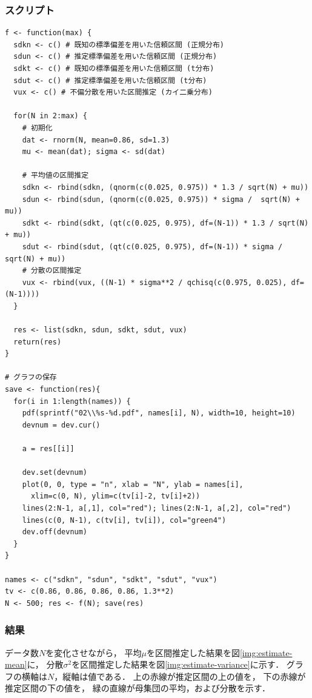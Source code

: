 \documentclass{jsarticle}
\begin{document}
\subsubsection*{スクリプト}
\begin{lstlisting}[basicstyle=\ttfamily\footnotesize, frame=single]
f <- function(max) {
  sdkn <- c() # 既知の標準偏差を用いた信頼区間 (正規分布)
  sdun <- c() # 推定標準偏差を用いた信頼区間 (正規分布)
  sdkt <- c() # 既知の標準偏差を用いた信頼区間 (t分布)
  sdut <- c() # 推定標準偏差を用いた信頼区間 (t分布)
  vux <- c() # 不偏分散を用いた区間推定 (カイ二乗分布)

  for(N in 2:max) {
    # 初期化
    dat <- rnorm(N, mean=0.86, sd=1.3)
    mu <- mean(dat); sigma <- sd(dat)

    # 平均値の区間推定
    sdkn <- rbind(sdkn, (qnorm(c(0.025, 0.975)) * 1.3 / sqrt(N) + mu))
    sdun <- rbind(sdun, (qnorm(c(0.025, 0.975)) * sigma /  sqrt(N) + mu))
    sdkt <- rbind(sdkt, (qt(c(0.025, 0.975), df=(N-1)) * 1.3 / sqrt(N) + mu))
    sdut <- rbind(sdut, (qt(c(0.025, 0.975), df=(N-1)) * sigma /  sqrt(N) + mu))
    # 分散の区間推定
    vux <- rbind(vux, ((N-1) * sigma**2 / qchisq(c(0.975, 0.025), df=(N-1))))
  }

  res <- list(sdkn, sdun, sdkt, sdut, vux)
  return(res)
}

# グラフの保存
save <- function(res){
  for(i in 1:length(names)) {
    pdf(sprintf("02\\%s-%d.pdf", names[i], N), width=10, height=10)
    devnum = dev.cur()
  
    a = res[[i]]
  
    dev.set(devnum)
    plot(0, 0, type = "n", xlab = "N", ylab = names[i],
      xlim=c(0, N), ylim=c(tv[i]-2, tv[i]+2))
    lines(2:N-1, a[,1], col="red"); lines(2:N-1, a[,2], col="red")
    lines(c(0, N-1), c(tv[i], tv[i]), col="green4")
    dev.off(devnum)
  }
}

names <- c("sdkn", "sdun", "sdkt", "sdut", "vux")
tv <- c(0.86, 0.86, 0.86, 0.86, 1.3**2)
N <- 500; res <- f(N); save(res)
\end{lstlisting}

\subsubsection*{結果}
データ数$N$を変化させながら，
平均$\mu$を区間推定した結果を図\ref{img:estimate-mean}に，
分散$\sigma^2$を区間推定した結果を図\ref{img:estimate-variance}に示す．
グラフの横軸は$N$，縦軸は値である．
上の赤線が推定区間の上の値を，
下の赤線が推定区間の下の値を，
緑の直線が母集団の平均，および分散を示す．
\end{document}
